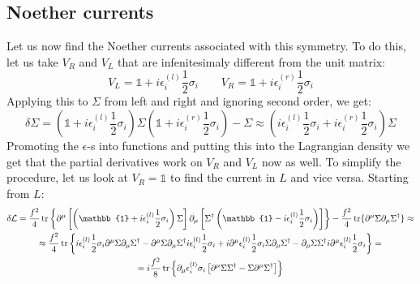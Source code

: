 \documentclass{article}
\begin{document}
\subsection{Noether currents}
Let us now find the Noether currents associated with this symmetry. To do this, let us take $V_R$ and $V_L$ that are infenitesimaly different from the unit matrix:
\begin{equation}
    V_L = \mathbb{1} + i\epsilon^{(l)}_i \frac{1}{2}\sigma_i
    \qquad
    V_R = \mathbb{1} + i\epsilon^{(r)}_i \frac{1}{2}\sigma_i
\end{equation}
Applying this to $\Sigma$ from left and right and ignoring second order, we get:
\begin{equation}
    \delta \Sigma = \left(\mathbb{1} + i\epsilon^{(l)}_i \frac{1}{2}\sigma_i\right) \Sigma \left(\mathbb{1} + i\epsilon^{(r)}_i \frac{1}{2}\sigma_i\right) - \Sigma \approx \left(i\epsilon^{(l)}_i \frac{1}{2}\sigma_i + i\epsilon^{(r)}_i \frac{1}{2}\sigma_i\right) \Sigma
\end{equation}
Promoting the $\epsilon$-s into functions and putting this into the Lagrangian density we get that the partial derivatives work on $V_R$ and $V_L$ now as well. To simplify the procedure, let us look at $V_R = \mathbb{1}$ to find the current in $L$ and vice versa. Starting from $L$:
\begin{equation}
\begin{gathered}
    \delta \mathcal{L} = \frac{f^2}{4}
        \tr\left\{\partial^\mu\left[\left(\mathbb{1} + i\epsilon^{(l)}_i \frac{1}{2}\sigma_i\right) \Sigma\right] \partial_\mu\left[\Sigma^\dagger \left(\mathbb{1} - i\epsilon^{(l)}_i \frac{1}{2}\sigma_i\right)\right]\right\} - \frac{f^2}{4}\tr\{
            \partial^\mu\Sigma\partial_\mu\Sigma^\dagger
        \}
    \approx \\ \approx \frac{f^2}{4}
        \tr\left\{i\epsilon^{(l)}_i \frac{1}{2}\sigma_i  \partial^\mu \Sigma \partial_\mu\Sigma^\dagger - \partial^\mu \Sigma \partial_\mu\Sigma^\dagger i\epsilon^{(l)}_i \frac{1}{2}\sigma_i + i\partial^\mu \epsilon^{(l)}_i \frac{1}{2}\sigma_i \Sigma \partial_\mu\Sigma^\dagger - \partial_\mu \Sigma \Sigma^\dagger i\partial^\mu \epsilon^{(l)}_i \frac{1}{2}\sigma_i \right\}
    = \\ = i \frac{f^2}{8}\tr\left\{\partial_\mu \epsilon^{(l)}_i \sigma_i \left[
            \partial^\mu \Sigma \Sigma^\dagger -
            \Sigma \partial^\mu \Sigma^\dagger
        \right]\right\}
\end{gathered}
\end{equation}
\end{document}
